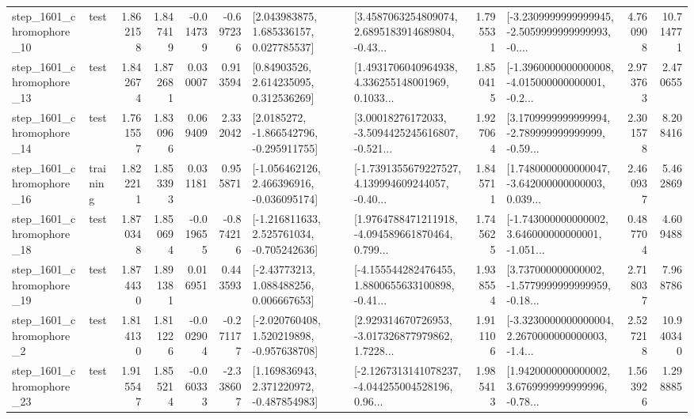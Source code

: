 \begin{tabular}{llrrrrllrlrr}
 step\_1601\_chromophore\_10 &      test &      1.862158 &    1.847419 &     -0.014739 & -0.697236 &     [2.043983875, 1.685336157, 0.027785537] &  [3.4587063254809074, 2.6895183914689804, -0.43... &       1.795531 &  [-3.2309999999999945, -2.5059999999999993, -0.... &            4.760908 &         10.714771 \\
 step\_1601\_chromophore\_13 &      test &      1.842674 &    1.872681 &      0.030007 &  0.913594 &      [0.84903526, 2.614235095, 0.312536269] &  [1.4931706040964938, 4.336255148001969, 0.1033... &       1.850415 &  [-1.3960000000000008, -4.015000000000001, -0.2... &            2.973763 &          2.470655 \\
 step\_1601\_chromophore\_14 &      test &      1.761557 &    1.830966 &      0.069409 &  2.332042 &     [2.0185272, -1.866542796, -0.295911755] &  [3.00018276172033, -3.5094425245616807, -0.521... &       1.927064 &  [3.1709999999999994, -2.789999999999999, -0.59... &            2.301578 &          8.208416 \\
 step\_1601\_chromophore\_16 &  training &      1.822211 &    1.853393 &      0.031181 &  0.955871 &   [-1.056462126, 2.466396916, -0.036095174] &  [-1.7391355679227527, 4.139994609244057, -0.40... &       1.845711 &  [1.7480000000000047, -3.642000000000003, 0.039... &            2.460937 &          5.462869 \\
 step\_1601\_chromophore\_18 &      test &      1.870348 &    1.850694 &     -0.019655 & -0.874216 &   [-1.216811633, 2.525761034, -0.705242636] &  [1.9764788471211918, -4.094589661870464, 0.799... &       1.745625 &  [-1.743000000000002, 3.646000000000001, -1.051... &            0.487704 &          4.609488 \\
 step\_1601\_chromophore\_19 &      test &      1.874430 &    1.891381 &      0.016951 &  0.443593 &     [-2.43773213, 1.088488256, 0.006667653] &  [-4.155544282476455, 1.8800655633100898, -0.41... &       1.938554 &  [3.737000000000002, -1.5779999999999959, -0.18... &            2.718037 &          7.968786 \\
  step\_1601\_chromophore\_2 &      test &      1.814130 &    1.811226 &     -0.002904 & -0.271177 &   [-2.020760408, 1.520219898, -0.957638708] &  [2.929314670726953, -3.017326877979862, 1.7228... &       1.911106 &  [-3.3230000000000004, 2.2670000000000003, -1.4... &            2.527218 &         10.940340 \\
 step\_1601\_chromophore\_23 &      test &      1.915547 &    1.855214 &     -0.060333 & -2.338607 &    [1.169836943, 2.371220972, -0.487854983] &  [-2.1267313141078237, -4.044255004528196, 0.96... &       1.985413 &  [1.9420000000000002, 3.6769999999999996, -0.78... &            1.563926 &          1.298885 \\

\end{tabular}
